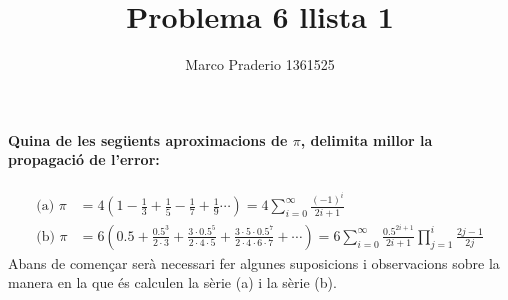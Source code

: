 \documentclass[a4paper,10pt]{article}
\title{Problema 6 llista 1}
\author{Marco Praderio 1361525}
\date{}
\renewcommand{\*}{\cdot}
\begin{document}
\maketitle
\paragraph{Quina de les següents aproximacions de $\pi$, delimita millor la propagació de l'error:}
\begin{equation*}
\begin{split}
 \text{(a) }\pi&=4\left(1-\frac{1}{3}+\frac{1}{5}-\frac{1}{7}+\frac{1}{9}\cdots\right)=4\sum_{i=0}^{\infty}\frac{(-1)^i}{2i+1}\\
 \text{(b) }\pi&=6\left(0.5+\frac{0.5^3}{2\*3}+\frac{3\*0.5^5}{2\*4\*5}+\frac{3\*5\*0.5^7}{2\*4\*6\*7}+\cdots\right)=6\sum_{i=0}^{\infty}\frac{0.5^{2i+1}}{2i+1}
 \prod_{j=1}^i\frac{2j-1}{2j}
 \end{split}
\end{equation*}
Abans de començar serà necessari fer algunes suposicions i observacions sobre la manera en la que és calculen la sèrie (a) i la sèrie (b).
\end{document}
